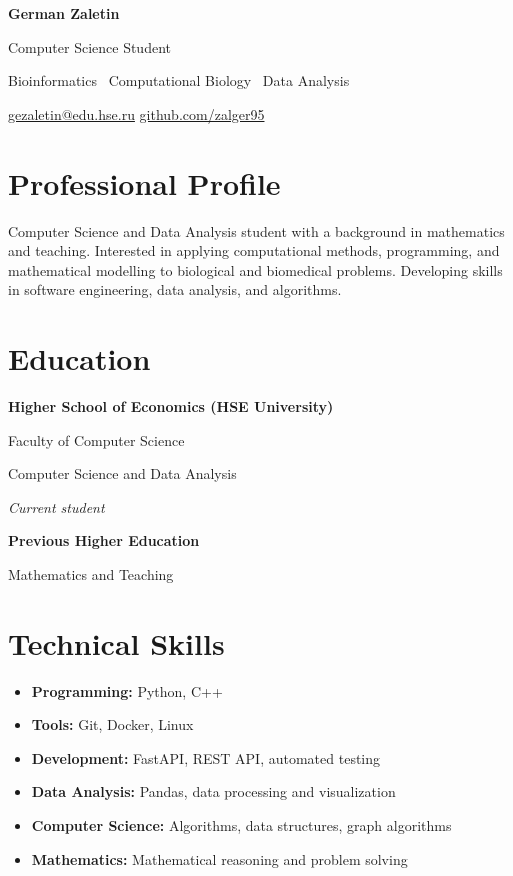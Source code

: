 \documentclass[9pt,a4paper]{article}
\begin{document}
\begin{center}
    {\Huge\bfseries\color{primary} German Zaletin}

    \vspace{5pt}

    {\large Computer Science Student}

    \vspace{4pt}

    {\color{secondary}
    Bioinformatics \textbar\
    Computational Biology \textbar\
    Data Analysis}

    \vspace{8pt}

    \href{mailto:gezaletin@edu.hse.ru}
    {gezaletin@edu.hse.ru}
    \quad \textbar \quad
    \href{https://github.com/zalger95}
    {github.com/zalger95}

\end{center}

\section*{Professional Profile}

Computer Science and Data Analysis student with a background
in mathematics and teaching. Interested in applying computational
methods, programming, and mathematical modelling to biological
and biomedical problems. Developing skills in software engineering,
data analysis, and algorithms.

\section*{Education}

\textbf{Higher School of Economics (HSE University)}

Faculty of Computer Science

Computer Science and Data Analysis

\textit{Current student}

\vspace{4pt}

\textbf{Previous Higher Education}

Mathematics and Teaching

\section*{Technical Skills}

\begin{itemize}
    \item \textbf{Programming:} Python, C++
    \item \textbf{Tools:} Git, Docker, Linux
    \item \textbf{Development:} FastAPI, REST API, automated testing
    \item \textbf{Data Analysis:} Pandas, data processing and visualization
    \item \textbf{Computer Science:} Algorithms, data structures, graph algorithms
    \item \textbf{Mathematics:} Mathematical reasoning and problem solving
\end{itemize}
\end{document}
